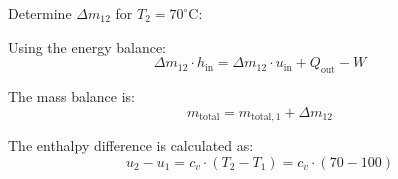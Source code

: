 Determine \( \Delta m_{12} \) for \( T_2 = 70^\circ\text{C} \):  

Using the energy balance:  
\[
\Delta m_{12} \cdot h_{\text{in}} = \Delta m_{12} \cdot u_{\text{in}} + Q_{\text{out}} - W
\]  

The mass balance is:  
\[
m_{\text{total}} = m_{\text{total},1} + \Delta m_{12}
\]  

The enthalpy difference is calculated as:  
\[
u_2 - u_1 = c_v \cdot (T_2 - T_1) = c_v \cdot (70 - 100)
\]